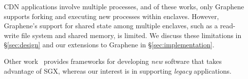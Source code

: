 CDN applications involve multiple processes, and of these works, only Graphene
supports forking and executing new processes within enclaves.
%
However, Graphene's support for shared state among multiple enclaves, such as a
read-write file system and shared memory, is limited.
%
We discuss these limitations in \S\ref{sec:design} and our extensions to
Graphene in \S\ref{sec:implementation}.


Other work~\cite{beekman2016improving} provides
frameworks for developing \emph{new} software that takes advantage of SGX,
whereas our interest is in supporting \emph{legacy} applications.









%

